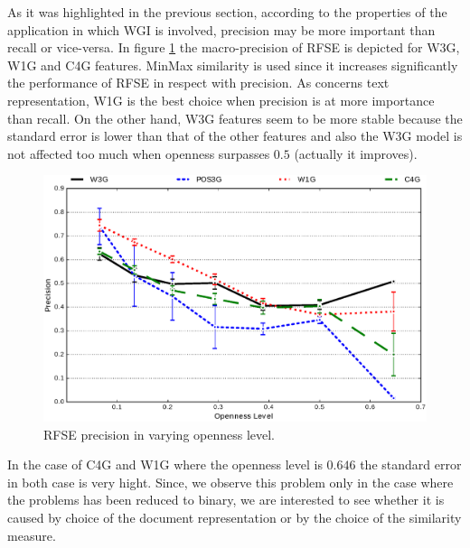 As it was highlighted in the previous section, according to the properties of the application in which WGI is involved, precision may be more important than recall or vice-versa. In figure \ref{fig:RFSE_precision_focus_openness_test} the macro-precision of RFSE is depicted for W3G, W1G and C4G features. MinMax similarity is used since it increases significantly the performance of RFSE in respect with precision. As concerns text representation, W1G is the best choice when precision is at more importance than recall. On the other hand, W3G features seem to be more stable because the standard error is lower than that of the other features and also the W3G model is not affected too much when openness surpasses $0.5$ (actually it improves).

\begin{figure}[H]
\begin{center}
    \includegraphics[scale=0.38]{diagrams/RFSE_Precision_Focus_openness_test_graph.eps}
	\caption{RFSE precision in varying openness level.}
	\label{fig:RFSE_precision_focus_openness_test}
\end{center}
\end{figure}

In the case of C4G and W1G where the openness level is $0.646$ the standard error in both case is very hight. Since, we observe this problem only in the case where the problems has been reduced to binary, we are interested to see whether it is caused by choice of the document representation or by the choice of the similarity measure.


